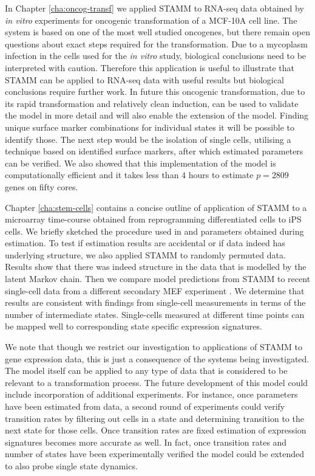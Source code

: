 In Chapter \ref{cha:oncog-transf} we applied STAMM to RNA-seq data obtained by {\it in vitro} experiments for oncogenic transformation of a MCF-10A cell line. The system is based on one of the most well studied oncogenes, but there remain open questions about exact steps required for the transformation. Due to a mycoplasm infection in the cells used for the {\it in vitro} study, biological conclusions need to be interpreted with caution. Therefore this application is useful to illustrate that STAMM can be applied to RNA-seq data with useful results but biological conclusions require further work. In future this oncogenic transformation, due to its rapid transformation and relatively clean induction, can be used to validate the model in more detail and will also enable the extension of the model. Finding unique surface marker combinations for individual states it will be possible to identify those. The next step would be the isolation of single cells, utilising a technique based on identified surface markers, after which estimated parameters can be verified. We also showed that this implementation of the model is computationally efficient and it takes less than $4$ hours to estimate $p=2809$ genes on fifty cores.

Chapter \ref{cha:stem-cells} contains a concise outline of application of STAMM to a microarray time-course obtained from reprogramming differentiated cells to iPS cells. We briefly sketched the procedure used in \cite{Armond:2013} and parameters obtained during estimation. To test if estimation results are accidental or if data indeed has underlying structure, we also applied STAMM to randomly permuted data. Results show that there was indeed structure in the data that is modelled by the latent Markov chain. Then we compare model predictions from STAMM to recent single-cell data from a different secondary MEF experiment \citep{Buganim:2012hp}. We determine that results are consistent with findings from single-cell measurements in terms of the number of intermediate states. Single-cells measured at different time points can be mapped well to corresponding state specific expression signatures.

We note that though we restrict our investigation to applications of STAMM to gene expression data, this is just a consequence of the systems being investigated. The model itself can be applied to any type of data that is considered to be relevant to a transformation process. The future development of this model could include incorporation of additional experiments. For instance, once parameters have been estimated from data, a second round of experiments could verify transition rates by filtering out cells in a state and determining transition to the next state for those cells. Once transition rates are fixed estimation of expression signatures becomes more accurate as well. In fact, once transition rates and number of states have been experimentally verified the model could be extended to also probe single state dynamics.

